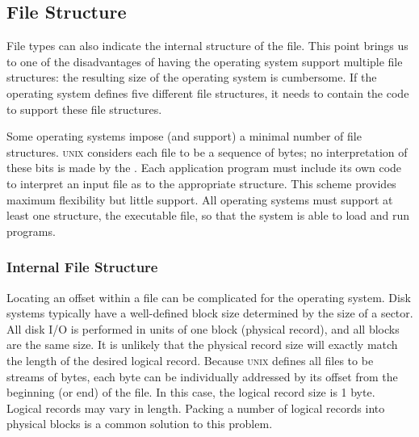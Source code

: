 \subsection{File Structure}\label{subsec:File_Structure}
File types can also indicate the internal structure of the file.
This point brings us to one of the disadvantages of having the operating system support multiple file structures: the resulting size of the operating system is cumbersome.
If the operating system defines five different file structures, it needs to contain the code to support these file structures.

Some operating systems impose (and support) a minimal number of file structures.
\textsc{unix} considers each file to be a sequence of bytes; no interpretation of these bits is made by the \textbf{}.
Each application program must include its own code to interpret an input file as to the appropriate structure.
This scheme provides maximum flexibility but little support.
All operating systems must support at least one structure, the executable file, so that the system is able to load and run programs.

\subsubsection{Internal File Structure}\label{subsubsec:Internal_File_Structure}
Locating an offset within a file can be complicated for the operating system.
Disk systems typically have a well-defined block size determined by the size of a sector.
All disk I/O is performed in units of one block (physical record), and all blocks are the same size.
It is unlikely that the physical record size will exactly match the length of the desired logical record.
Because \textsc{unix} defines all files to be streams of bytes, each byte can be individually addressed by its offset from the beginning (or end) of the file.
In this case, the logical record size is 1 byte.
Logical records may vary in length.
Packing a number of logical records into physical blocks is a common solution to this problem.


